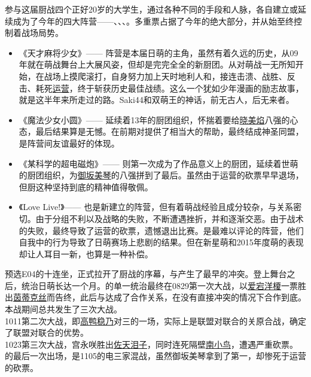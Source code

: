 参与这届厨战四个正好20岁的大学生，通过各种不同的手段和人脉，各自建立或延续成为了今年的四大阵营——、、、。多重票占据了今年的绝大部分，并从始至终控制着战场局势。

\begin{itemize}
\item 《{天才麻将少女}》——
阵营是本届日萌的主角，虽然有着久远的历史，从09年就在萌战舞台上大展风姿，但却是完完全全的新厨团。从对萌战一无所知开始，在战场上摸爬滚打，自身努力加上天时地利人和，接连击溃、战胜、反击、耗死\uline{运营}，终于斩获历史最佳战绩。这么一个犹如少年漫画的励志故事，就是这半年来所走过的路。Saki44和双萌王的神话，前无古人，后无来者。
\item 《{魔法少女小圆}》——
延续着13年的厨团组织，怀揣着要给\uline{晓美焰}八强的心态，最后结果算是无憾。在前期对提供了相当大的帮助，最终结成神圣同盟，是阵营间友谊最好的体现。
\item 《{某科学的超电磁炮}》——
则第一次成为了作品意义上的厨团，延续着世萌的厨团组织，为\uline{御坂美琴}的八强拼到了最后。虽然由于运营的砍票早早退场，但厨这种坚持到底的精神值得敬佩。
\item 《{Love Live!}》——
也是新建立的阵营，但有着萌战经验且成分较杂，与关系密切。由于分组不利以及战略的失败，不断遭遇挫折，并和逐渐交恶。由于战术的失败，最终导致了运营的砍票，遗憾退出比赛。是最难以评论的阵营，他们自我中的行为导致了日萌赛场上悲剧的结果。但在新星萌和2015年度萌的表现却让人耳目一新，也算是一种补偿。
\end{itemize}

\newpage

预选E04的十连坐，正式拉开了厨战的序幕，与产生了最早的冲突。登上舞台之后，统治日萌长达一个月。的单一统治最终在0829第一次大战，以\uline{爱宕洋榎}一票胜出\uline{茵蒂克丝}而告终，此后与达成了合作关系，在没有直接冲突的情况下合作到底。本战期间总共发生了三次大战。\\
1011第二次大战，即\uline{高鸭稳乃}对三的一场，实际上是联盟对联合的关原合战，确定了联盟对联合的优势。\\
1023第三次大战，宫永咲胜出\uline{佐天泪子}，同时连死隔壁\uline{南小鸟}，遭遇严重砍票。\\
的最后一次出场，是1105的电三家混战，虽然御坂美琴拿到了第一，却惨死于运营的砍票。

